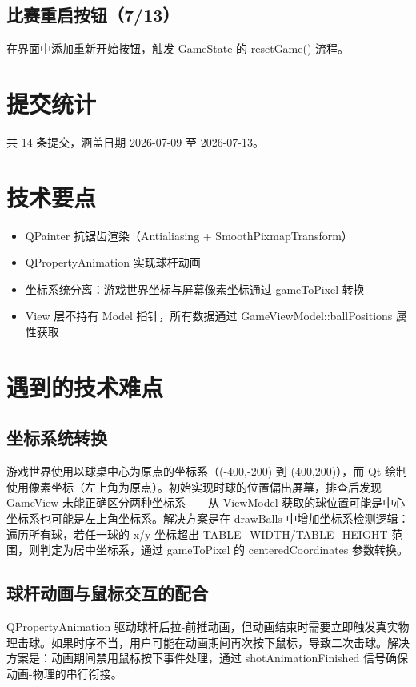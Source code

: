 \documentclass[11pt]{ctexart}
\begin{document}
\subsection{比赛重启按钮（7/13）}

在界面中添加重新开始按钮，触发 GameState 的 resetGame() 流程。

\section{提交统计}

共 14 条提交，涵盖日期 2026-07-09 至 2026-07-13。

\section{技术要点}

\begin{itemize}
\item QPainter 抗锯齿渲染（Antialiasing + SmoothPixmapTransform）
\item QPropertyAnimation 实现球杆动画
\item 坐标系统分离：游戏世界坐标与屏幕像素坐标通过 gameToPixel 转换
\item View 层不持有 Model 指针，所有数据通过 GameViewModel::ballPositions 属性获取
\end{itemize}

\section{遇到的技术难点}

\subsection{坐标系统转换}

游戏世界使用以球桌中心为原点的坐标系（(-400,-200) 到 (400,200)），而 Qt 绘制使用像素坐标（左上角为原点）。初始实现时球的位置偏出屏幕，排查后发现 GameView 未能正确区分两种坐标系——从 ViewModel 获取的球位置可能是中心坐标系也可能是左上角坐标系。解决方案是在 drawBalls 中增加坐标系检测逻辑：遍历所有球，若任一球的 x/y 坐标超出 TABLE\_WIDTH/TABLE\_HEIGHT 范围，则判定为居中坐标系，通过 gameToPixel 的 centeredCoordinates 参数转换。

\subsection{球杆动画与鼠标交互的配合}

QPropertyAnimation 驱动球杆后拉-前推动画，但动画结束时需要立即触发真实物理击球。如果时序不当，用户可能在动画期间再次按下鼠标，导致二次击球。解决方案是：动画期间禁用鼠标按下事件处理，通过 shotAnimationFinished 信号确保动画-物理的串行衔接。
\end{document}
